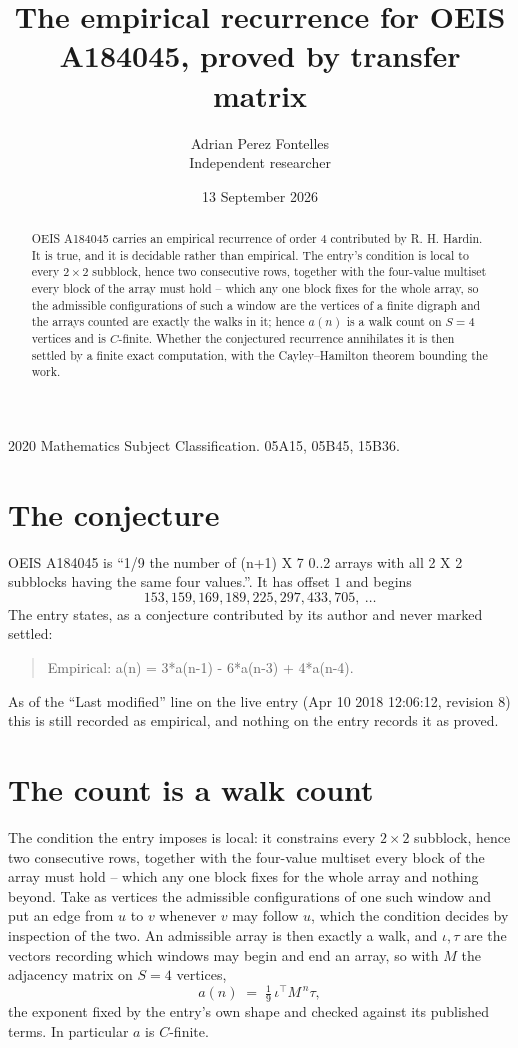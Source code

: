 \documentclass[11pt,a4paper]{article}
\title{The empirical recurrence for OEIS A184045, proved by transfer matrix}
\author{Adrian Perez Fontelles\\ \small Independent researcher}
\date{13 September 2026}
\theoremstyle{plain}
\theoremstyle{definition}
\begin{document}
\maketitle

\begin{abstract}
OEIS A184045 carries an empirical recurrence of order $4$ contributed by R. H. Hardin. It is
true, and it is decidable rather than empirical. The entry's condition is local to every $2\times2$ subblock, hence two consecutive rows, together with the four-value multiset every block of the array must hold -- which any one block fixes for the whole array, so
the admissible configurations of such a window are the vertices of a finite digraph and the
arrays counted are exactly the walks in it; hence $a(n)$ is a walk count on $S=4$ vertices
and is $C$-finite. Whether the conjectured recurrence annihilates it is then settled by a
finite exact computation, with the Cayley--Hamilton theorem bounding the work.
\end{abstract}

\noindent\small 2020 Mathematics Subject Classification. 05A15, 05B45, 15B36.\normalsize

\section{The conjecture}

OEIS A184045 is ``1/9 the number of (n+1) X 7 0..2 arrays with all 2 X 2 subblocks having the same four values.''. It has offset $1$ and begins
\[
153, 159, 169, 189, 225, 297, 433, 705,\ \dots
\]
The entry states, as a conjecture contributed by its author and never marked settled:
\begin{quote}
Empirical: a(n) = 3*a(n-1) - 6*a(n-3) + 4*a(n-4).
\end{quote}
As of the ``Last modified'' line on the live entry (Apr 10 2018 12:06:12, revision 8) this is still
recorded as empirical, and nothing on the entry records it as proved.

\section{The count is a walk count}

The condition the entry imposes is local: it constrains every $2\times2$ subblock, hence two consecutive rows, together with the four-value multiset every block of the array must hold -- which any one block fixes for the whole array and nothing beyond. Take as vertices the admissible configurations of one such window and put an edge from $u$ to $v$ whenever $v$ may follow $u$, which the condition decides by inspection of the two.
An admissible array is then exactly a walk, and $\iota,\tau$ are the vectors recording which windows may begin and end an array, so with $M$ the adjacency matrix on $S=4$ vertices,
\[
a(n)\;=\;\tfrac{1}{9}\,\iota^{\!\top}M^{\,n}\tau ,
\]
the exponent fixed by the entry's own shape and checked against its published terms. In
particular $a$ is $C$-finite.
\end{document}
